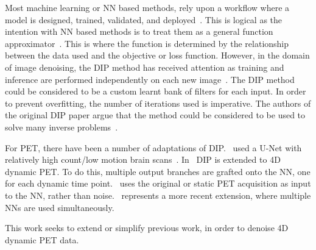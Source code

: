         Most machine learning or \gls{NN} based methods, rely upon a workflow where a model is designed, trained, validated, and deployed~\parencite{Krose1993AnNetworks}. This is logical as the intention with \gls{NN} based methods is to treat them as a general function approximator~\parencite{Krose1993AnNetworks}. This is where the function is determined by the relationship between the data used and the objective or loss function. However, in the domain of image denoising, the \gls{DIP} method has received attention as training and inference are performed independently on each new image~\parencite{Ulyanov2020DeepPrior}. The \gls{DIP} method could be considered to be a custom learnt bank of filters for each input. In order to prevent overfitting, the number of iterations used is imperative. The authors of the original \gls{DIP} paper argue that the method could be considered to be used to solve many inverse problems~\parencite{Ulyanov2020DeepPrior}.
        
        For \gls{PET}, there have been a number of adaptations of \gls{DIP}.~\parencite{Gong2019PETPrior} used a U-Net with relatively high count/low motion brain scans~\parencite{Weng2021INet:Segmentation}. In~\parencite{Hashimoto20214DNetwork} \gls{DIP} is extended to \gls{4D} dynamic \gls{PET}. To do this, multiple output branches are grafted onto the \gls{NN}, one for each dynamic time point.~\parencite{Hashimoto2019DynamicDatasets} uses the original or static \gls{PET} acquisition as input to the \gls{NN}, rather than noise.~\parencite{Yang2022SimultaneousPrior} represents a more recent extension, where multiple \glspl{NN} are used simultaneously.
        
        This work seeks to extend or simplify previous work, in order to denoise \gls{4D} dynamic \gls{PET} data.
    
